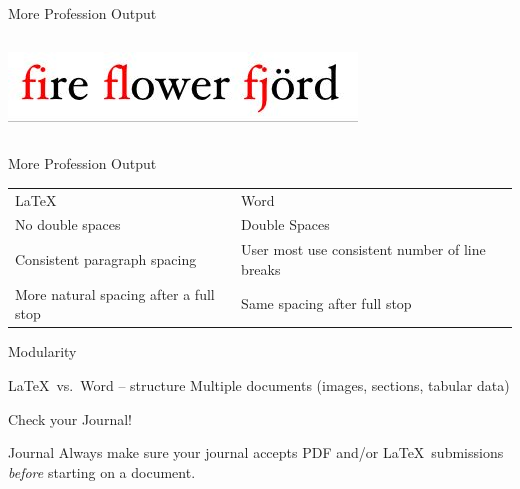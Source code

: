 \documentclass[final,aspectratio=43]{beamer}
\begin{document}
\begin{frame}{More Profession Output}
\begin{columns}
\begin{column}{0.5\linewidth}
\begin{center}
            \includegraphics[width=\linewidth]{figures/ligatures_word}
            
            \end{center}
        \end{column}
    \end{columns}
\end{frame}

\begin{frame}{More Profession Output}
    \centering
    \renewcommand{\arraystretch}{2}
    \begin{tabularx}{0.9\linewidth}{X@{\hskip 1cm}X}
    {\Huge\LaTeX} & {\Huge Word} \\
    No double spaces & Double Spaces \\
    Consistent paragraph spacing & User most use consistent number of line breaks \\
    More natural spacing after a full stop & Same spacing after full stop \\
    \end{tabularx}
\end{frame}

\begin{frame}{Modularity}
    \begin{block}{\LaTeX\ vs.\ Word -- structure}
        Multiple documents (images, sections, tabular data)
    \end{block}
    
    
\end{frame}

\begin{frame}{Check your Journal!}
    \begin{alertblock}{Journal}
        Always make sure your journal accepts PDF and/or \LaTeX\ submissions \emph{before} starting on a document.
    \end{alertblock}
    
\end{frame}
\end{document}
